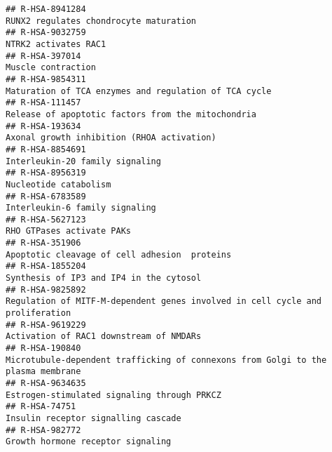 \documentclass[
]{article}
\begin{document}
\begin{verbatim}
## R-HSA-8941284                                                                                               RUNX2 regulates chondrocyte maturation
## R-HSA-9032759                                                                                                                 NTRK2 activates RAC1
## R-HSA-397014                                                                                                                    Muscle contraction
## R-HSA-9854311                                                                                Maturation of TCA enzymes and regulation of TCA cycle
## R-HSA-111457                                                                                    Release of apoptotic factors from the mitochondria
## R-HSA-193634                                                                                            Axonal growth inhibition (RHOA activation)
## R-HSA-8854691                                                                                                      Interleukin-20 family signaling
## R-HSA-8956319                                                                                                                Nucleotide catabolism
## R-HSA-6783589                                                                                                       Interleukin-6 family signaling
## R-HSA-5627123                                                                                                            RHO GTPases activate PAKs
## R-HSA-351906                                                                                         Apoptotic cleavage of cell adhesion  proteins
## R-HSA-1855204                                                                                              Synthesis of IP3 and IP4 in the cytosol
## R-HSA-9825892                                                        Regulation of MITF-M-dependent genes involved in cell cycle and proliferation
## R-HSA-9619229                                                                                              Activation of RAC1 downstream of NMDARs
## R-HSA-190840                                                      Microtubule-dependent trafficking of connexons from Golgi to the plasma membrane
## R-HSA-9634635                                                                                          Estrogen-stimulated signaling through PRKCZ
## R-HSA-74751                                                                                                    Insulin receptor signalling cascade
## R-HSA-982772                                                                                                     Growth hormone receptor signaling

\end{verbatim}
\end{document}
